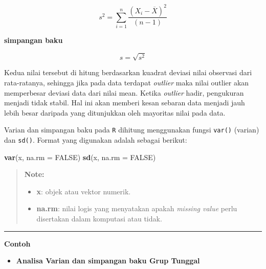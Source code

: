 \documentclass[]{book}
\newenvironment{Shaded}{\begin{snugshade}}{\end{snugshade}}
\newcommand{\KeywordTok}[1]{\textcolor[rgb]{0.13,0.29,0.53}{\textbf{#1}}}
\newcommand{\DataTypeTok}[1]{\textcolor[rgb]{0.13,0.29,0.53}{#1}}
\newcommand{\OtherTok}[1]{\textcolor[rgb]{0.56,0.35,0.01}{#1}}
\newcommand{\NormalTok}[1]{#1}
\providecommand{\tightlist}{%
  \setlength{\itemsep}{0pt}\setlength{\parskip}{0pt}}
\begin{document}
\begin{equation}
  s^2=\sum_{i=1}^n\frac{\left(X_i-\overline{X}\right)^2}{\left(n-1\right)}
  \label{eq:var}
\end{equation}

\textbf{simpangan baku}

\begin{equation}
  s=\sqrt{s^2}
  \label{eq:sd}
\end{equation}

Kedua nilai tersebut di hitung berdasarkan kuadrat deviasi nilai
observasi dari rata-ratanya, sehingga jika pada data terdapat
\emph{outlier} maka nilai outlier akan memperbesar deviasi data dari
nilai mean. Ketika \emph{outlier} hadir, pengukuran menjadi tidak
stabil. Hal ini akan memberi kesan sebaran data menjadi jauh lebih besar
daripada yang ditunjukkan oleh mayoritas nilai pada data.

Varian dan simpangan baku pada \texttt{R} dihitung menggunakan fungsi
\texttt{var()} (varian) dan \texttt{sd()}. Format yang digunakan adalah
sebagai berikut:

\begin{Shaded}
\begin{Highlighting}[]
\KeywordTok{var}\NormalTok{(x, }\DataTypeTok{na.rm =} \OtherTok{FALSE}\NormalTok{)}
\KeywordTok{sd}\NormalTok{(x, }\DataTypeTok{na.rm =} \OtherTok{FALSE}\NormalTok{)}
\end{Highlighting}
\end{Shaded}

\begin{quote}
\textbf{Note:}

\begin{itemize}
\tightlist
\item
  \textbf{x}: objek atau vektor numerik.
\item
  \textbf{na.rm}: nilai logis yang menyatakan apakah \emph{missing
  value} perlu disertakan dalam komputasi atau tidak.
\end{itemize}
\end{quote}

\begin{center}\rule{0.5\linewidth}{\linethickness}\end{center}

\textbf{Contoh}

\begin{itemize}
\tightlist
\item
  \textbf{Analisa Varian dan simpangan baku Grup Tunggal}
\end{itemize}
\end{document}
